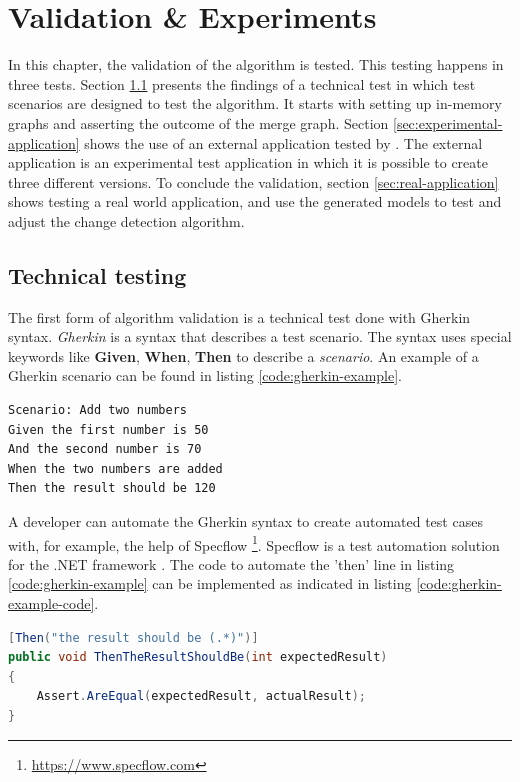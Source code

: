 \chapter{Validation \& Experiments} \label{chapter:validation-experiments}

In this chapter, the validation of the algorithm is tested. This testing happens in three tests. Section \ref{sec:scenarios-testing} presents the findings of a technical test in which test scenarios are designed to test the algorithm. It starts with setting up in-memory graphs and asserting the outcome of the merge graph. Section \ref{sec:experimental-application} shows the use of an external application tested by \testar. The external application is an experimental test application in which it is possible to create three different versions. To conclude the validation, section \ref{sec:real-application} shows testing a real world application, and use the generated models to test and adjust the change detection algorithm. 

\section{Technical testing} \label{sec:scenarios-testing}
The first form of algorithm validation is a technical test done with Gherkin syntax. \textit{Gherkin} is a syntax that describes a test scenario. The syntax uses special keywords like \textbf{Given}, \textbf{When}, \textbf{Then} to describe a \textit{scenario}. An example of a Gherkin scenario can be found in listing \ref{code:gherkin-example}.

\begin{lstlisting}[language=Gherkin, caption=Calculator test example, label=code:gherkin-example]
Scenario: Add two numbers
Given the first number is 50
And the second number is 70
When the two numbers are added
Then the result should be 120
\end{lstlisting}

A developer can automate the Gherkin syntax to create automated test cases with, for example, the help of Specflow \footnote{\url{https://www.specflow.com}}. Specflow is a test automation solution for the .NET framework \cite{specflow}. The code to automate the 'then' line in listing \ref{code:gherkin-example} can be implemented as indicated in listing \ref{code:gherkin-example-code}.

\begin{lstlisting}[language=Java, caption=Implementation of a 'then' line, label=code:gherkin-example-code]
[Then("the result should be (.*)")]
public void ThenTheResultShouldBe(int expectedResult)
{
    Assert.AreEqual(expectedResult, actualResult);
}
\end{lstlisting}

